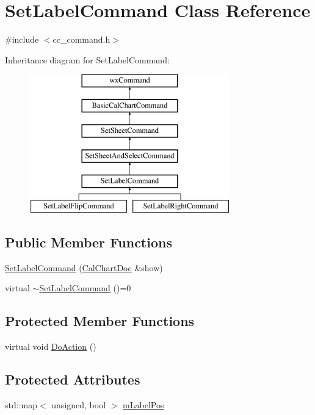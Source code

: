 \hypertarget{a00127}{\section{Set\-Label\-Command Class Reference}
\label{a00127}
}


{\ttfamily \#include $<$cc\-\_\-command.\-h$>$}

Inheritance diagram for Set\-Label\-Command\-:\begin{figure}[H]
\begin{center}
\leavevmode
\includegraphics[height=6.000000cm]{a00127}
\end{center}
\end{figure}
\subsection*{Public Member Functions}
\begin{DoxyCompactItemize}
\item 
\hyperlink{a00127_ac11511d886ddb34ec45ca4d8a6b51249}{Set\-Label\-Command} (\hyperlink{a00020}{Cal\-Chart\-Doc} \&show)
\item 
virtual \hyperlink{a00127_a1618d33895ef785bf78207674a44f346}{$\sim$\-Set\-Label\-Command} ()=0
\end{DoxyCompactItemize}
\subsection*{Protected Member Functions}
\begin{DoxyCompactItemize}
\item 
virtual void \hyperlink{a00127_a1b03e239de9656b4fabe64f52ef502bb}{Do\-Action} ()
\end{DoxyCompactItemize}
\subsection*{Protected Attributes}
\begin{DoxyCompactItemize}
\item 
std\-::map$<$ unsigned, bool $>$ \hyperlink{a00127_ad0e6f911ca2fdc3c73909c53ce4e0313}{m\-Label\-Pos}
\end{DoxyCompactItemize}


